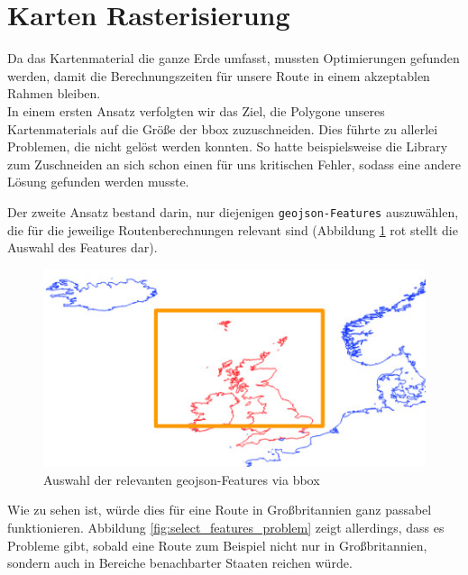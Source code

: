 \documentclass[letterpaper]{article}
\begin{document}
\section{Karten Rasterisierung}
	Da das Kartenmaterial die ganze Erde umfasst, mussten Optimierungen gefunden werden, damit die Berechnungszeiten für unsere Route in einem akzeptablen Rahmen bleiben.\\

	In einem ersten Ansatz verfolgten wir das Ziel, die Polygone unseres Kartenmaterials auf die Größe der bbox zuzuschneiden. Dies führte zu allerlei Problemen, die nicht gelöst werden konnten. So hatte beispielsweise die Library zum Zuschneiden an sich schon einen für uns kritischen Fehler\footnotemark, sodass eine andere Lösung gefunden werden musste.

	Der zweite Ansatz bestand darin, nur diejenigen \texttt{geojson-Features} auszuwählen, die für die jeweilige Routenberechnungen relevant sind (Abbildung \ref{fig:select_features} rot stellt die Auswahl des Features dar).

	\begin{figure}[!htbp]
		\centering
		\includegraphics[width=\linewidth]{select_features}
		\caption{Auswahl der relevanten geojson-Features via bbox}
		\label{fig:select_features}
	\end{figure}

	Wie zu sehen ist, würde dies für eine Route in Großbritannien ganz passabel funktionieren. Abbildung \ref{fig:select_features_problem} zeigt allerdings, dass es Probleme gibt, sobald eine Route zum Beispiel nicht nur in Großbritannien, sondern auch in Bereiche benachbarter Staaten reichen würde. 
\end{document}
